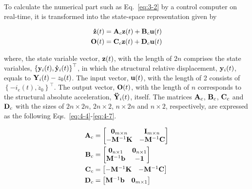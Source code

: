 To calculate the numerical part such as Eq.~\eqref{eq:3-2} by a control computer on real-time, it is transformed into the state-space representation given by

\begin{equation}\label{eq:4-3}
\begin{aligned}
\mathbf{\dot{z}}(t)&=\mathbf{A}_{c}\mathbf{z}(t)+\mathbf{B}_{c}\mathbf{u}(t)\\
\mathbf{O}(t)&=\mathbf{C}_{c}\mathbf{z}(t)+\mathbf{D}_{c}\mathbf{u}(t)
\end{aligned}
\end{equation}

where, the state variable vector, $\mathbf{z}(t)$, with the length of $2n$ comprises the state variables, $\left\{\mathbf{y}_{i}(t),\mathbf{\dot{y}}_{i}(t)\right\}^{\top}$, in which the structural relative displacement, $\mathbf{y}_{i}(t)$, equals to $\mathbf{Y}_{i}(t)-z_{0}(t)$. The input vector, $\mathbf{u}(t)$, with the length of 2 consists of $\left\{-i_{e}(t), \ddot{z}_{0}\right\}^{\top}$. The output vector, $\mathbf{O}(t)$, with the length of $n$ corresponds to the structural absolute acceleration, $\mathbf{\ddot{Y}}_{i}(t)$, itself. The matrices $\mathbf{A}_{c}$, $\mathbf{B}_{c}$, $\mathbf{C}_{c}$ and $\mathbf{D}_{c}$ with the sizes of $2n \times 2n$, $2n \times 2$, $n \times 2n$ and $n \times 2$, respectively, are expressed as the following Eqs.~\eqref{eq:4-4}-\eqref{eq:4-7}.

\begin{align}
\mathbf{A}_{c}&=\begin{bmatrix} \mathbf{0}_{m\times n}&\mathbf{I}_{m \times n}\\-\mathbf{M}^{-1}\mathbf{K}&-\mathbf{M}^{-1}\mathbf{C}\end{bmatrix} \label{eq:4-4}\\
\mathbf{B}_{c}&=\begin{bmatrix} \mathbf{0}_{n\times 1}&\mathbf{0}_{n\times 1}\\ \mathbf{M}^{-1}\mathbf{b}&\mathbf{-1}\end{bmatrix} \label{eq:4-5}\\
\mathbf{C}_{c}&=\begin{bmatrix} -\mathbf{M}^{-1}\mathbf{K}&-\mathbf{M}^{-1}\mathbf{C}\end{bmatrix} \label{eq:4-6}\\
\mathbf{D}_{c}&=\begin{bmatrix} \mathbf{M}^{-1}\mathbf{b}&\mathbf{0}_{m \times 1}\end{bmatrix} \label{eq:4-7}
\end{align}

